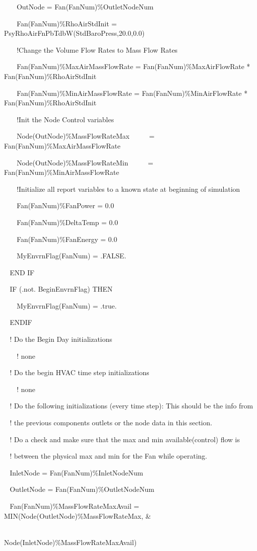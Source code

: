~~~ OutNode = Fan(FanNum)\%OutletNodeNum

~~~ Fan(FanNum)\%RhoAirStdInit = PsyRhoAirFnPbTdbW(StdBaroPress,20.0,0.0)

~~~ !Change the Volume Flow Rates to Mass Flow Rates

~~~ Fan(FanNum)\%MaxAirMassFlowRate = Fan(FanNum)\%MaxAirFlowRate *~ Fan(FanNum)\%RhoAirStdInit

~~~ Fan(FanNum)\%MinAirMassFlowRate = Fan(FanNum)\%MinAirFlowRate *~ Fan(FanNum)\%RhoAirStdInit

~~~ !Init the Node Control variables

~~~ Node(OutNode)\%MassFlowRateMax~~~~~ = Fan(FanNum)\%MaxAirMassFlowRate

~~~ Node(OutNode)\%MassFlowRateMin~~~~~ = Fan(FanNum)\%MinAirMassFlowRate

~~~ !Initialize all report variables to a known state at beginning of simulation

~~~ Fan(FanNum)\%FanPower = 0.0

~~~ Fan(FanNum)\%DeltaTemp = 0.0

~~~ Fan(FanNum)\%FanEnergy = 0.0

~~~ MyEnvrnFlag(FanNum) = .FALSE.

~ END IF

~ IF (.not. BeginEnvrnFlag) THEN

~~~ MyEnvrnFlag(FanNum) = .true.

~ ENDIF

~ ! Do the Begin Day initializations

~~~ ! none

~ ! Do the begin HVAC time step initializations

~~~ ! none

~ ! Do the following initializations (every time step): This should be the info from

~ ! the previous components outlets or the node data in this section.

~ ! Do a check and make sure that the max and min available(control) flow is

~ ! between the physical max and min for the Fan while operating.

~ InletNode = Fan(FanNum)\%InletNodeNum

~ OutletNode = Fan(FanNum)\%OutletNodeNum

~ Fan(FanNum)\%MassFlowRateMaxAvail = MIN(Node(OutletNode)\%MassFlowRateMax, \&

~~~~~~~~~~~~~~~~~~~~~~~~~~~~~~~~~~~~~~~~~~~~~ Node(InletNode)\%MassFlowRateMaxAvail)


